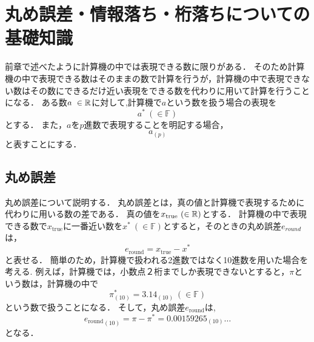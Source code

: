 \chapter{丸め誤差・情報落ち・桁落ちについての基礎知識}
前章で述べたように計算機の中では表現できる数に限りがある．
そのため計算機の中で表現できる数はそのままの数で計算を行うが，計算機の中で表現できない数はその数にできるだけ近い表現をできる数を代わりに用いて計算を行うことになる．
ある数$a\ \in \mathbb{R}$に対して,計算機で$a$という数を扱う場合の表現を
\begin{equation}    
    a^{\ast} \ (\in \mathbb{F})
\end{equation}
とする．
また，$a$を$p$進数で表現することを明記する場合，
\begin{equation}
    a_{(p)}
\end{equation}
と表すことにする．
\label{chap:基礎知識2}
\section{丸め誤差}
丸め誤差について説明する．
丸め誤差とは，真の値と計算機で表現するために代わりに用いる数の差である．
真の値を$x_{\mathrm{true}} \ (\in \mathbb{R})$とする．
計算機の中で表現できる数で$x_{\mathrm{true}}$に一番近い数を$x^{\ast} \ (\in \mathbb{F})$とすると，そのときの丸め誤差$e_{round}$は，
\begin{equation}
    e_{\mathrm{round}} = x_{\mathrm{true}} - x^{\ast}
\end{equation}
と表せる．
簡単のため，計算機で扱われる2進数ではなく10進数を用いた場合を考える.
例えば，計算機では，小数点２桁までしか表現できないとすると，$\pi$という数は，計算機の中で
\begin{equation}
    \pi^{\ast}_{(10)} = 3.14_{(10)} \ (\in \mathbb{F})
\end{equation}
という数で扱うことになる．
そして，丸め誤差$e_{\mathrm{round}}$は,
\begin{equation}
    {e_{\mathrm{round}}}_{(10)} = \pi - \pi^{\ast} = {0.00159265_{(10)}\dots}
\end{equation}
となる．


